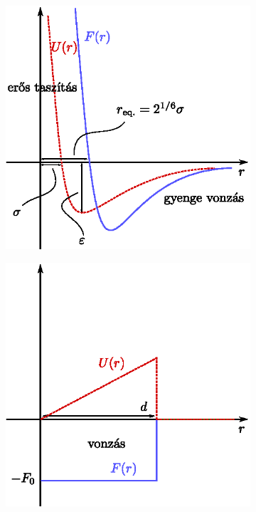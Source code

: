\begin{figure}[!h]
    \centering
    \begin{subfigure}[t]{0.45\textwidth}
            \centering
            \includegraphics[width=\textwidth]{termo_4/termo_4_4}
            \label{fig:termo_4_4}
    \end{subfigure}\hfill
    \begin{subfigure}[t]{0.45\textwidth}
            \centering
            \includegraphics[width=\textwidth]{termo_4/termo_4_5}
            \label{fig:termo_4_5}
    \end{subfigure}
\end{figure}
